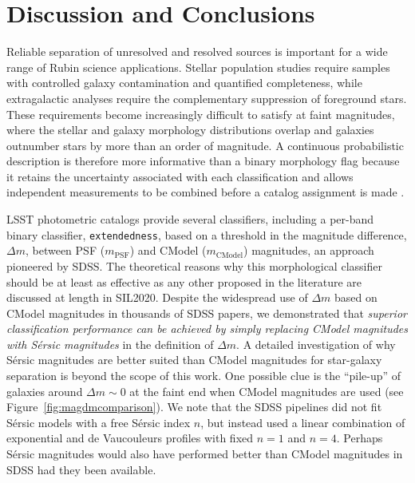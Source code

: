 
\section{Discussion and Conclusions}
\label{sec:discussion}

Reliable separation of unresolved and resolved sources is important for a wide range of Rubin
science applications. Stellar population studies require samples with controlled galaxy
contamination and quantified completeness, while extragalactic analyses require the complementary
suppression of foreground stars. These requirements become increasingly difficult to satisfy at
faint magnitudes, where the stellar and galaxy morphology distributions overlap and galaxies
outnumber stars by more than an order of magnitude. A continuous probabilistic description is
therefore more informative than a binary morphology flag because it retains the uncertainty
associated with each classification and allows independent measurements to be combined before a
catalog assignment is made \citep[][SIL2020]{Henrion2011BayesianSG}.


LSST photometric catalogs provide several classifiers, including a per-band binary classifier,
\texttt{extendedness}, based on a threshold in the magnitude difference, $\Delta m$, between PSF
($m_{\mathrm{PSF}}$) and CModel ($m_{\mathrm{CModel}}$) magnitudes, an approach pioneered by
SDSS. The theoretical reasons why this morphological classifier should be at least as effective as
any other proposed in the literature are discussed at length in SIL2020. Despite the widespread use
of $\Delta m$ based on CModel magnitudes in thousands of SDSS papers, we demonstrated that {\it
  superior classification performance can be achieved by simply replacing CModel magnitudes with
  S\'{e}rsic magnitudes} in the definition of $\Delta m$. A detailed investigation of why S\'{e}rsic
magnitudes are better suited than CModel magnitudes for star-galaxy separation is beyond the scope
of this work. One possible clue is the ``pile-up'' of galaxies around $\Delta m \sim 0$ at the faint
end when CModel magnitudes are used (see Figure~\ref{fig:magdmcomparison}). We note that the SDSS pipelines
\citep{2002SPIE.4836..350L} did not fit S\'{e}rsic models with a free S\'{e}rsic index $n$, but
instead used a linear combination of exponential and de Vaucouleurs profiles with fixed $n=1$ and
$n=4$. Perhaps S\'{e}rsic magnitudes would also have performed better than CModel magnitudes in SDSS
had they been available.


